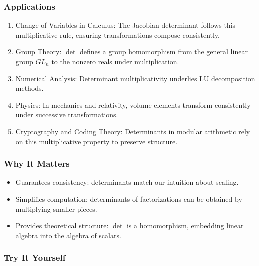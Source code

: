 \documentclass[
  letterpaper,
  DIV=11,
  numbers=noendperiod]{scrreprt}
\providecommand{\tightlist}{%
  \setlength{\itemsep}{0pt}\setlength{\parskip}{0pt}}
\begin{document}
\subsubsection{Applications}\label{applications-17}

\begin{enumerate}
\def\labelenumi{\arabic{enumi}.}
\tightlist
\item
  Change of Variables in Calculus: The Jacobian determinant follows this
  multiplicative rule, ensuring transformations compose consistently.
\item
  Group Theory: \(\det\) defines a group homomorphism from the general
  linear group \(GL_n\) to the nonzero reals under multiplication.
\item
  Numerical Analysis: Determinant multiplicativity underlies LU
  decomposition methods.
\item
  Physics: In mechanics and relativity, volume elements transform
  consistently under successive transformations.
\item
  Cryptography and Coding Theory: Determinants in modular arithmetic
  rely on this multiplicative property to preserve structure.
\end{enumerate}

\subsubsection{Why It Matters}\label{why-it-matters-51}

\begin{itemize}
\tightlist
\item
  Guarantees consistency: determinants match our intuition about
  scaling.
\item
  Simplifies computation: determinants of factorizations can be obtained
  by multiplying smaller pieces.
\item
  Provides theoretical structure: \(\det\) is a homomorphism, embedding
  linear algebra into the algebra of scalars.
\end{itemize}

\subsubsection{Try It Yourself}\label{try-it-yourself-54}
\end{document}
